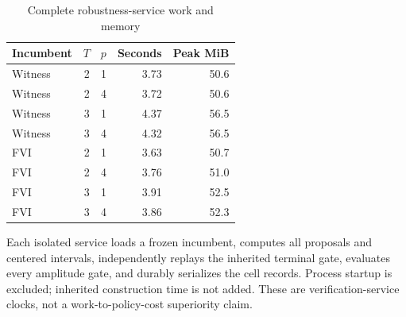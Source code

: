 \begin{table}[htbp]
\caption{Complete robustness-service work and memory}
\label{tab:work52}
\centering\small
\begin{tabular}{lrrrr}
\toprule
Incumbent & $T$ & $p$ & Seconds & Peak MiB \\
\midrule
Witness & 2 & 1 & 3.73 & 50.6 \\
Witness & 2 & 4 & 3.72 & 50.6 \\
Witness & 3 & 1 & 4.37 & 56.5 \\
Witness & 3 & 4 & 4.32 & 56.5 \\
FVI & 2 & 1 & 3.63 & 50.7 \\
FVI & 2 & 4 & 3.76 & 51.0 \\
FVI & 3 & 1 & 3.91 & 52.5 \\
FVI & 3 & 4 & 3.86 & 52.3 \\
\bottomrule
\end{tabular}
\parbox{0.96\textwidth}{\footnotesize Each isolated service loads a frozen incumbent, computes all proposals and centered intervals, independently replays the inherited terminal gate, evaluates every amplitude gate, and durably serializes the cell records. Process startup is excluded; inherited construction time is not added. These are verification-service clocks, not a work-to-policy-cost superiority claim.}
\end{table}
